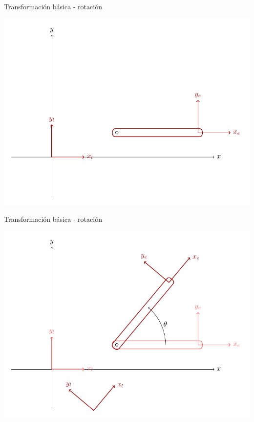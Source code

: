 \documentclass[presentation,aspectratio=169]{beamer}
\begin{document}
\begin{frame}[label={sec:orgf9a91b6}]{Transformación básica - rotación}
\begin{center}
 \includegraphics[height=0.8\textheight]{../figures/2d-revolute-default-pos.pdf}
\end{center}
\end{frame}


\begin{frame}[label={sec:org56b8091}]{Transformación básica - rotación}
\begin{center}
 \includegraphics[height=0.8\textheight]{../figures/2d-revolute.pdf}
\end{center}
\end{frame}
\end{document}
